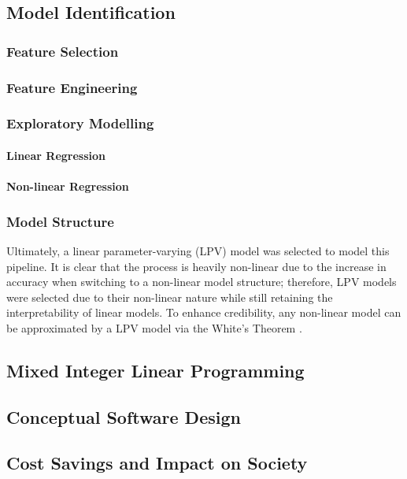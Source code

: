 \subsection{Model Identification}
\subsubsection{Feature Selection}
\subsubsection{Feature Engineering}
\subsubsection{Exploratory Modelling}
\paragraph{Linear Regression}
\paragraph{Non-linear Regression}

\subsubsection{Model Structure}
Ultimately, a linear parameter-varying (LPV) model was selected to model this pipeline.  It is clear that the process is heavily non-linear due to the increase in accuracy when switching to a non-linear model structure; therefore, LPV models were selected due to their non-linear nature while still retaining the interpretability of linear models. To enhance credibility, any non-linear model can be approximated by a LPV model via the White's Theorem \cite{LPV}.

\subsection{Mixed Integer Linear Programming}
\subsection{Conceptual Software Design}
\subsection{Cost Savings and Impact on Society}
